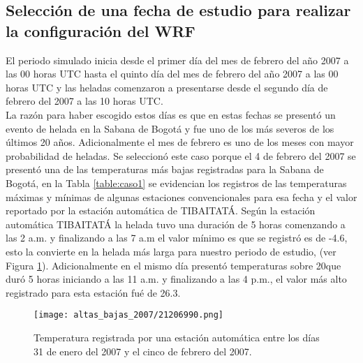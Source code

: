 \subsection{Selección de una fecha de estudio para realizar la configuración del WRF}

El periodo simulado inicia desde el primer día del mes de febrero del año 2007 a las 00 horas UTC hasta el quinto día del mes de febrero del año 2007 a las 00 horas UTC y las heladas comenzaron a presentarse desde el  segundo día de febrero del 2007 a las 10 horas UTC.\\

La razón para haber escogido estos días es que en estas fechas se presentó un evento de helada en la Sabana de Bogotá y fue uno de los más severos de los últimos 20 años. Adicionalmente el mes de febrero es uno de los meses con mayor probabilidad de heladas. Se seleccionó este caso porque el 4 de febrero del 2007 se presentó una de las temperaturas más bajas registradas para la Sabana de Bogotá, en la Tabla \ref{table:caso1} se evidencian los registros de las temperaturas máximas y mínimas de algunas estaciones convencionales para esa fecha y el valor reportado por la estación automática de TIBAITATÁ. Según la estación automática TIBAITATÁ la helada tuvo una duración de 5 horas comenzando a las 2 a.m. y finalizando a las 7 a.m el valor mínimo es que se registró es de -4.6\celc, esto la convierte en la helada más larga para nuestro periodo de estudio, (ver Figura \ref{gra:tmp_tiba_2007}). Adicionalmente en el mismo día presentó temperaturas sobre 20\celc que duró 5 horas iniciando a las 11 a.m. y finalizando a las 4 p.m., el valor más alto registrado para esta estación fué de 26.3\celc.

\begin{figure}[H]
    \centering
    \texttt{[image: altas\_bajas\_2007/21206990.png]}
    \caption{Temperatura registrada por una estación automática entre los días 31 de enero del 2007 y el cinco de febrero del 2007.}
    \label{gra:tmp_tiba_2007}
\end{figure}


